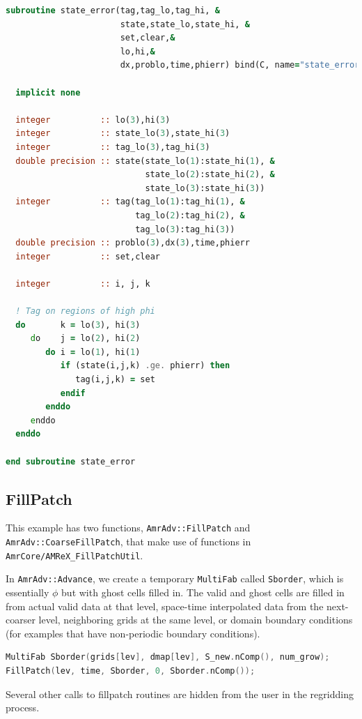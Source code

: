 \begin{lstlisting}[language=fortran]
subroutine state_error(tag,tag_lo,tag_hi, &
                       state,state_lo,state_hi, &
                       set,clear,&
                       lo,hi,&
                       dx,problo,time,phierr) bind(C, name="state_error")

  implicit none
  
  integer          :: lo(3),hi(3)
  integer          :: state_lo(3),state_hi(3)
  integer          :: tag_lo(3),tag_hi(3)
  double precision :: state(state_lo(1):state_hi(1), &
                            state_lo(2):state_hi(2), &
                            state_lo(3):state_hi(3))
  integer          :: tag(tag_lo(1):tag_hi(1), &
                          tag_lo(2):tag_hi(2), &
                          tag_lo(3):tag_hi(3))
  double precision :: problo(3),dx(3),time,phierr
  integer          :: set,clear

  integer          :: i, j, k

  ! Tag on regions of high phi
  do       k = lo(3), hi(3)
     do    j = lo(2), hi(2)
        do i = lo(1), hi(1)
           if (state(i,j,k) .ge. phierr) then
              tag(i,j,k) = set
           endif
        enddo
     enddo
  enddo

end subroutine state_error
\end{lstlisting}

\subsection{FillPatch}
This example has two functions, {\tt AmrAdv::FillPatch} and {\tt AmrAdv::CoarseFillPatch},
that make use of functions in {\tt AmrCore/AMReX\_FillPatchUtil}.

In {\tt AmrAdv::Advance}, we create a temporary {\tt MultiFab} called {\tt Sborder}, which
is essentially $\phi$ but with ghost cells filled in.  The valid and ghost cells are filled in from
actual valid data at that level, space-time interpolated data from the next-coarser level, 
neighboring grids at the same level, or domain boundary conditions 
(for examples that have non-periodic boundary conditions).
\begin{lstlisting}[language=cpp]
MultiFab Sborder(grids[lev], dmap[lev], S_new.nComp(), num_grow);
FillPatch(lev, time, Sborder, 0, Sborder.nComp());
\end{lstlisting}
Several other calls to fillpatch routines are hidden from the user in the regridding process.
